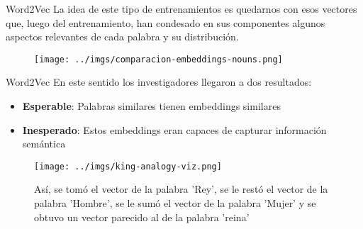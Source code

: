 \documentclass{beamer}
\begin{document}
%
%
%
%
%
%

\begin{frame}{Word2Vec}
La idea de este tipo de entrenamientos es quedarnos con esos vectores que, luego del entrenamiento, han condesado en sus componentes algunos aspectos relevantes de cada palabra y su distribución. 
\begin{figure}
    \centering
    \texttt{[image: ../imgs/comparacion-embeddings-nouns.png]} %
    
\end{figure}
\end{frame}

\begin{frame}{Word2Vec}
En este sentido los investigadores llegaron a dos resultados: 
\begin{itemize}
\item \textbf{Esperable}: Palabras similares tienen embeddings similares
\item \textbf{Inesperado}: Estos embeddings eran capaces de capturar información semántica
\end{itemize}

\begin{figure}
    \centering
    \texttt{[image: ../imgs/king-analogy-viz.png]} %
    \caption{\tiny Así, se tomó el vector de la palabra 'Rey', se le restó el vector de la palabra 'Hombre', se le sumó el vector de la palabra 'Mujer' y se obtuvo un vector parecido al de la palabra 'reina' }
    \label{miimagen}
\end{figure}

\end{frame}
\end{document}
